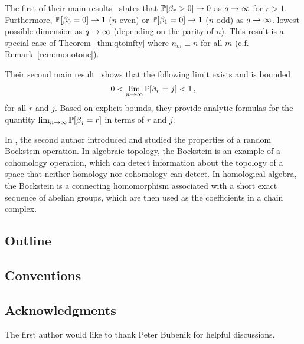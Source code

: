 The first of their main results~\cite[Thm 2.1]{ginzburg2017random} states that
$\mathbb{P}[\beta_r > 0] \rightarrow 0$ as $q \rightarrow \infty$ for $r>1$. Furthermore, $\mathbb{P}[\beta_0
= 0] \rightarrow 1$ ($n$-even) or $\mathbb{P}[\beta_1 = 0] \rightarrow 1$ ($n$-odd) as $q \rightarrow \infty$.
lowest possible dimension as $q \rightarrow \infty$ (depending on the parity of $n$).
This result is a special case of Theorem~\ref{thm:qtoinfty} where $n_m \equiv
n$ for all $m$ (c.f.  Remark~\ref{rem:monotone}).

Their second main result~\cite[Thm 2.2]{ginzburg2017random} shows that 
the following limit exists and is bounded
\[
  0 < \lim_{n \rightarrow \infty} \mathbb{P}[\beta_r = j] < 1 \, ,
\]
for all $r$ and $j$. Based on explicit bounds, they provide analytic
formulas for the quantity $\lim_{n\rightarrow \infty}\mathbb{P}[\beta_j=r]$ in terms
of $r$ and $j$.

In \cite{zabka2018random}, the second author introduced and studied the properties of a random Bockstein operation. In algebraic topology, the Bockstein is an example of a cohomology operation, which can detect information about the topology of a space that neither homology nor cohomology can detect. In homological algebra, the Bockstein is a connecting homomorphism associated with a short exact sequence of abelian groups, which are then used as the coefficients in a chain complex. 


\subsection*{Outline}

\subsection*{Conventions}

\subsection*{Acknowledgments} The first author would like to thank
Peter Bubenik for helpful discussions.
